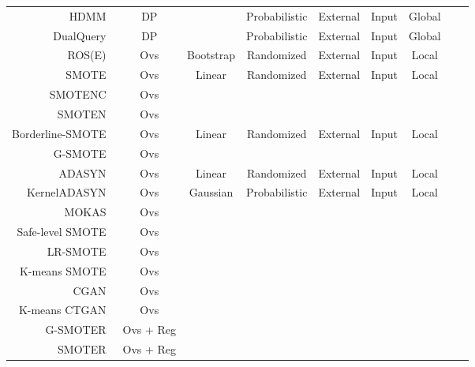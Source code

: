 \documentclass[parskip=full]{scrartcl}
\begin{document}
\begin{longtable}{rcccccccc}
      HDMM~\cite{mckenna2018optimizing} & DP &  & Probabilistic & External & Input & Global \\
      DualQuery~\cite{gaboardi2014dual} & DP &  & Probabilistic & External & Input & Global \\
      ROS(E)~\cite{menardi2014training} & Ovs & Bootstrap & Randomized & External & Input & Local \\ 
      SMOTE~\cite{chawla2002smote} & Ovs & Linear & Randomized & External & Input & Local \\
      SMOTENC~\cite{chawla2002smote} & Ovs \\
      SMOTEN~\cite{chawla2002smote} & Ovs \\
      Borderline-SMOTE~\cite{han2005borderline} & Ovs & Linear & Randomized & External & Input & Local \\
      G-SMOTE~\cite{douzas2019geometric} & Ovs \\
      ADASYN~\cite{he2008adasyn} & Ovs & Linear & Randomized & External & Input & Local\\
      KernelADASYN~\cite{tang2015kerneladasyn} & Ovs & Gaussian & Probabilistic & External & Input & Local \\
      MOKAS~\cite{lin2017minority} & Ovs \\
      Safe-level SMOTE~\cite{bunkhumpornpat2009safe} & Ovs \\
      LR-SMOTE~\cite{liang2020lr} & Ovs \\
      K-means SMOTE~\cite{douzas2018improving} & Ovs \\
      CGAN~\cite{douzas2018effective} & Ovs \\
      K-means CTGAN~\cite{an2021k} & Ovs \\
      G-SMOTER~\cite{camacho2022geometric} & Ovs + Reg \\
      SMOTER~\cite{torgo2013smote} & Ovs + Reg \\
\end{longtable}
\endgroup


% 
% 
% 
\end{document}
